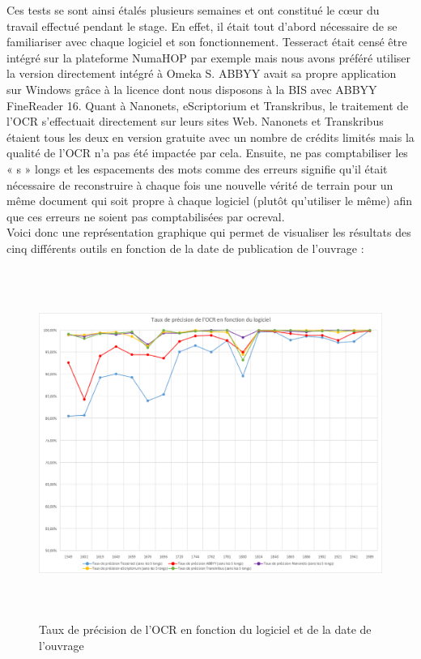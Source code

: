\documentclass[a4paper,12pt,twoside]{book}
\begin{document}
	Ces tests se sont ainsi étalés plusieurs semaines et ont constitué le cœur du travail effectué pendant le stage. En effet, il était tout d'abord nécessaire de se familiariser avec chaque logiciel et son fonctionnement. Tesseract était censé être intégré sur la plateforme NumaHOP par exemple mais nous avons préféré utiliser la version directement intégré à Omeka S. ABBYY avait sa propre application sur Windows grâce à la licence dont nous disposons à la BIS avec ABBYY FineReader 16. Quant à Nanonets, eScriptorium et Transkribus, le traitement de l'OCR s'effectuait directement sur leurs sites Web. Nanonets et Transkribus étaient tous les deux en version gratuite avec un nombre de crédits limités mais la qualité de l'OCR n'a pas été impactée par cela. Ensuite, ne pas comptabiliser les « s » longs et les espacements des mots comme des erreurs signifie qu'il était nécessaire de reconstruire à chaque fois une nouvelle vérité de terrain pour un même document qui soit propre à chaque logiciel (plutôt qu'utiliser le même) afin que ces erreurs ne soient pas comptabilisées par ocreval. \\
	
	Voici donc une représentation graphique qui permet de visualiser les
	résultats des cinq différents outils en fonction de la date de
	publication de l'ouvrage : \\
	
	\begin{figure} [H]
		\includegraphics[width=6.15625in,height=4.5in]{vertopal_157ae480aa4a4b07be198b586a812241/media/image13.png}
		\caption{Taux de précision de l'OCR en fonction du logiciel et de la
			date de l'ouvrage}
	\end{figure}
	
\end{document}
